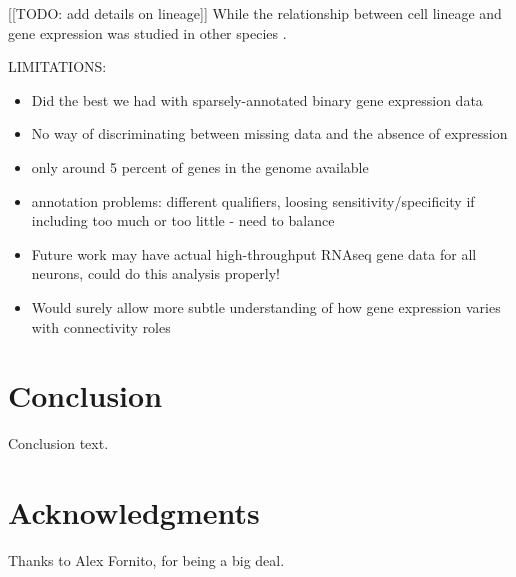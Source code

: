 \documentclass[10pt,letterpaper]{article}
\begin{document}
[[TODO: add details on lineage]] While the relationship between cell lineage and gene expression was studied in other species \citep{Cui2007, Kluger2004}.

LIMITATIONS:
\begin{itemize}
    \item Did the best we had with sparsely-annotated binary gene expression data
    \item No way of discriminating between missing data and the absence of expression
    \item only around 5 percent of genes in the genome available
    \item annotation problems: different qualifiers, loosing sensitivity/specificity if including too much or too little - need to balance
    \item Future work may have actual high-throughput RNAseq gene data for all neurons, could do this analysis properly!
    \item Would surely allow more subtle understanding of how gene expression varies with connectivity roles
\end{itemize}

\section*{Conclusion}

Conclusion text.

\section*{Acknowledgments}
Thanks to Alex Fornito, for being a big deal.

\nolinenumbers

%
%
%



\end{document}
